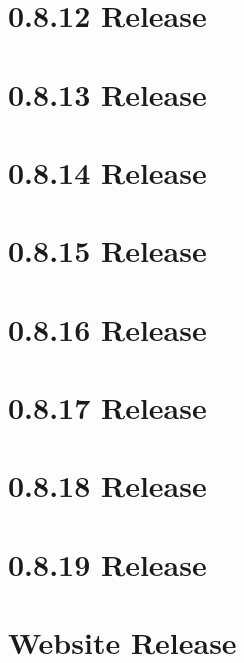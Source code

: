 \documentclass[twoside]{book}
\newcommand{\+}{\discretionary{\mbox{\scriptsize$\hookleftarrow$}}{}{}}
\begin{document}
\chapter{0.8.12 Release}
\label{doc_news_2015-07-13_0_8_12_md}

\chapter{0.8.13 Release}
\label{doc_news_2015-09-17_0_8_13_md}

\chapter{0.8.14 Release}
\label{doc_news_2015-11-19_0_8_14_md}

\chapter{0.8.15 Release}
\label{doc_news_2016-02-16_0_8_15_md}

\chapter{0.8.16 Release}
\label{doc_news_2016-04-29_0_8_16_md}

\chapter{0.8.17 Release}
\label{doc_news_2016-06-14_0_8_17_md}

\chapter{0.8.18 Release}
\label{doc_news_2016-09-17_0_8_18_md}

\chapter{0.8.19 Release}
\label{doc_news_2016-11-22_0_8_19_md}

\chapter{Website Release}
\label{doc_news_2016-12-17_website_release_md}

\end{document}
